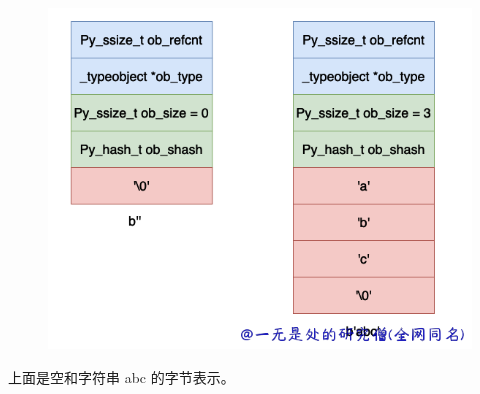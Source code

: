     \begin{figure}[H]
        \centering
            \includegraphics[scale=.25]{images/29-bytes.png}
						\caption{ }
        \label{fig:my_label}
    \end{figure}
    
上面是空和字符串 abc 的字节表示。
